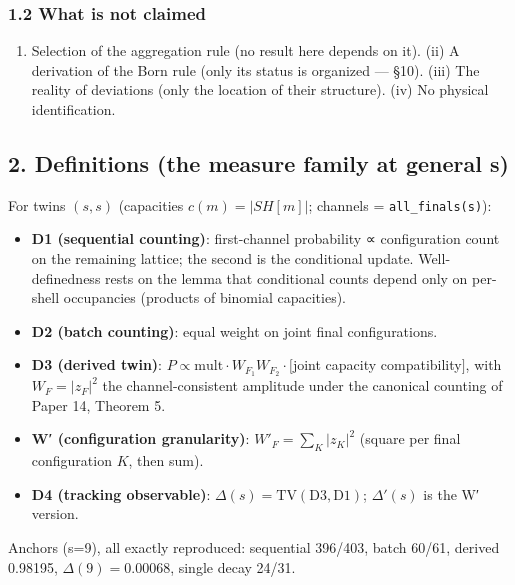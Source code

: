 \documentclass[
]{article}
\providecommand{\tightlist}{%
  \setlength{\itemsep}{0pt}\setlength{\parskip}{0pt}}
\begin{document}
\subsubsection{1.2 What is not claimed}\label{what-is-not-claimed}

\begin{enumerate}
\def\labelenumi{(\roman{enumi})}
\tightlist
\item
  Selection of the aggregation rule (no result here depends on it). (ii)
  A derivation of the Born rule (only its status is organized --- §10).
  (iii) The reality of deviations (only the location of their
  structure). (iv) No physical identification.
\end{enumerate}

\subsection{2. Definitions (the measure family at general
s)}\label{definitions-the-measure-family-at-general-s}

For twins \((s,s)\) (capacities \(c(m)=|SH[m]|\); channels =
\texttt{all\_finals(s)}):

\begin{itemize}
\tightlist
\item
  \textbf{D1 (sequential counting)}: first-channel probability ∝
  configuration count on the remaining lattice; the second is the
  conditional update. Well-definedness rests on the lemma that
  conditional counts depend only on per-shell occupancies (products of
  binomial capacities).
\item
  \textbf{D2 (batch counting)}: equal weight on joint final
  configurations.
\item
  \textbf{D3 (derived twin)}:
  \(P\propto \mathrm{mult}\cdot W_{F_1}W_{F_2}\cdot[\)joint capacity
  compatibility\(]\), with \(W_F=|z_F|^2\) the channel-consistent
  amplitude under the canonical counting of Paper 14, Theorem 5.
\item
  \textbf{W′ (configuration granularity)}: \(W'_F=\sum_K|z_K|^2\)
  (square per final configuration \(K\), then sum).
\item
  \textbf{D4 (tracking observable)}:
  \(\Delta(s)=\mathrm{TV}(\text{D3},\text{D1})\); \(\Delta'(s)\) is the
  W′ version.
\end{itemize}

Anchors (s=9), all exactly reproduced: sequential 396/403, batch 60/61,
derived 0.98195, \(\Delta(9)=0.00068\), single decay 24/31.
\end{document}
